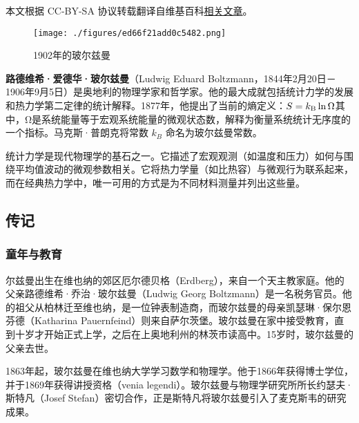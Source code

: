 
本文根据 CC-BY-SA 协议转载翻译自维基百科\href{https://en.wikipedia.org/wiki/Ludwig_Boltzmann}{相关文章}。

\begin{figure}[ht]
\centering
\texttt{[image: ./figures/ed66f21add0c5482.png]}
\caption{1902年的玻尔兹曼} \label{fig_BRZM_1}
\end{figure}
\textbf{路德维希·爱德华·玻尔兹曼}（Ludwig Eduard Boltzmann，1844年2月20日－1906年9月5日）是奥地利的物理学家和哲学家。他的最大成就包括统计力学的发展和热力学第二定律的统计解释。1877年，他提出了当前的熵定义：\(S = k_{\rm B}\ln\Omega \)其中，Ω是系统能量等于宏观系统能量的微观状态数，解释为衡量系统统计无序度的一个指标。马克斯·普朗克将常数 \( k_B \) 命名为玻尔兹曼常数。

统计力学是现代物理学的基石之一。它描述了宏观观测（如温度和压力）如何与围绕平均值波动的微观参数相关。它将热力学量（如比热容）与微观行为联系起来，而在经典热力学中，唯一可用的方式是为不同材料测量并列出这些量。
\subsection{传记}  
\subsubsection{童年与教育}  
尔兹曼出生在维也纳的郊区厄尔德贝格（Erdberg），来自一个天主教家庭。他的父亲路德维希·乔治·玻尔兹曼（Ludwig Georg Boltzmann）是一名税务官员。他的祖父从柏林迁至维也纳，是一位钟表制造商，而玻尔兹曼的母亲凯瑟琳·保尔恩芬德（Katharina Pauernfeind）则来自萨尔茨堡。玻尔兹曼在家中接受教育，直到十岁才开始正式上学，之后在上奥地利州的林茨市读高中。15岁时，玻尔兹曼的父亲去世。

1863年起，玻尔兹曼在维也纳大学学习数学和物理学。他于1866年获得博士学位，并于1869年获得讲授资格（venia legendi）。玻尔兹曼与物理学研究所所长约瑟夫·斯特凡（Josef Stefan）密切合作，正是斯特凡将玻尔兹曼引入了麦克斯韦的研究成果。
